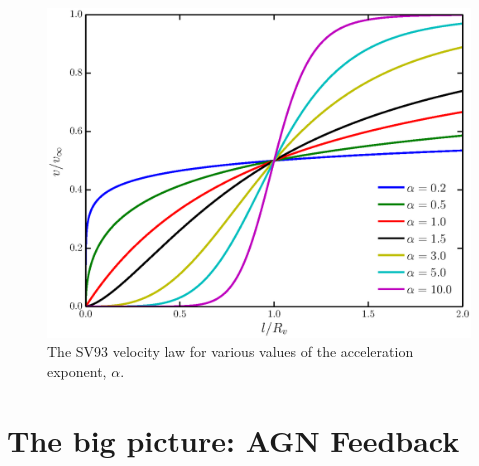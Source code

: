 \begin{figure}
\centering
\includegraphics[width=1.0\textwidth]{figures/05-cvpaper/acc_law.eps}
\caption{
The SV93 velocity law for various values of the
acceleration exponent, $\alpha$.
} 
\label{acc_law}
\end{figure}




\section{The big picture: AGN Feedback}
\label{sec:agn_feedback}

